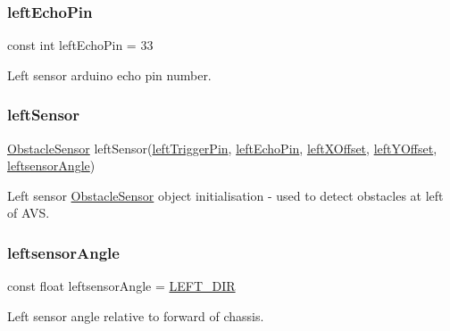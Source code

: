 \subsubsection{\texorpdfstring{left\+Echo\+Pin}{leftEchoPin}}
{\footnotesize\ttfamily const int left\+Echo\+Pin = 33}



Left sensor arduino echo pin number. 

\mbox{\label{bot_main_8ino_af137d1119f05ab98ae8e50559b9d6bfe}} 
\subsubsection{\texorpdfstring{left\+Sensor}{leftSensor}}
{\footnotesize\ttfamily \mbox{\hyperlink{class_obstacle_sensor}{Obstacle\+Sensor}} left\+Sensor(\mbox{\hyperlink{bot_main_8ino_abf577279d52f4a773937cb36cc199c0b}{left\+Trigger\+Pin}}, \mbox{\hyperlink{bot_main_8ino_ad1b4a0b41d14f603ba696fad472c50d9}{left\+Echo\+Pin}}, \mbox{\hyperlink{bot_main_8ino_a2d121af61e2977de12f5bfbbe8559dca}{left\+X\+Offset}}, \mbox{\hyperlink{bot_main_8ino_a7be9826e4f54e376321bcdea4177a8ed}{left\+Y\+Offset}}, \mbox{\hyperlink{bot_main_8ino_a8be5324bad65fa0bad41e0c70066a958}{leftsensor\+Angle}})}



Left sensor \mbox{\hyperlink{class_obstacle_sensor}{Obstacle\+Sensor}} object initialisation -\/ used to detect obstacles at left of A\+VS. 

\mbox{\label{bot_main_8ino_a8be5324bad65fa0bad41e0c70066a958}} 
\subsubsection{\texorpdfstring{leftsensor\+Angle}{leftsensorAngle}}
{\footnotesize\ttfamily const float leftsensor\+Angle = \mbox{\hyperlink{bot_main_8ino_a748e2ff253570331d3cd8f51ccc17f03}{L\+E\+F\+T\+\_\+\+D\+IR}}}



Left sensor angle relative to forward of chassis. 

\mbox{\label{bot_main_8ino_abf577279d52f4a773937cb36cc199c0b}} 
